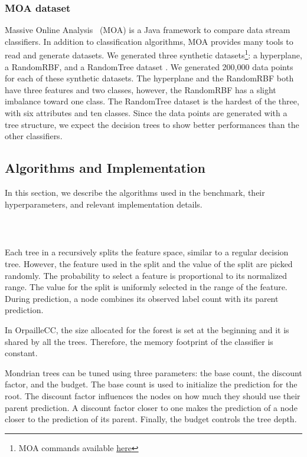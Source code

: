 \subsubsection{MOA dataset}
Massive Online Analysis~\cite{moa} (MOA) is a Java framework to compare
data stream classifiers. In addition to classification algorithms, MOA provides many
tools to read and generate datasets.
We generated three synthetic datasets\footnote{MOA commands available \href{https://github.com/azazel7/paper-benchmark/blob/e0c9a94d0d17490f7ab14293dec20b8322a6447c/Makefile\#L90}{here}}:
a hyperplane, a RandomRBF, and a RandomTree
dataset . We generated 200,000 data points
 for each of these synthetic datasets.
The hyperplane and the RandomRBF both have three features and two classes, however, the RandomRBF has a slight imbalance toward one class.
The RandomTree dataset is the hardest of the three, with six attributes and
ten classes. Since the data points are generated with a tree structure, we
expect the decision trees to show better performances than the other
classifiers.

\subsection{Algorithms and Implementation}
In this section, we describe the algorithms used in the benchmark, their
hyperparameters, and relevant implementation details. 

\subsubsection{\mondrianforest~\cite{mondrian2014}}
Each tree in a \mondrianforest recursively splits
the feature space, similar to a regular decision tree.
However, the feature used in the split and the
value of the split are picked randomly. The
probability to select a feature is proportional to
its normalized range. The value for the split is
uniformly selected in the range of the feature.
During prediction, a node combines its observed
label count with its parent prediction.

In OrpailleCC, the size allocated for the forest
is set at the beginning and it is shared by all
the trees.  Therefore, the memory footprint of the
classifier is constant.

Mondrian trees can be tuned using three
parameters: the base count, the discount factor,
and the budget. The base count is used to
initialize the prediction for the root. The
discount factor influences the nodes on how much
they should use their parent prediction. A
discount factor closer to one makes the prediction
of a node closer to the prediction of its parent.
Finally, the budget controls the tree depth.

